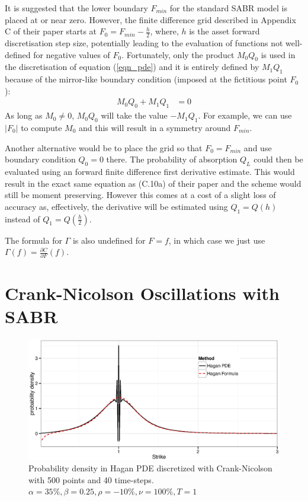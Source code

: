 \documentclass[]{rAMF2e}
\begin{document}
It is suggested that the lower boundary $F_{min}$ for the standard SABR model is placed at or near zero. However, the finite difference grid described in Appendix C of their paper starts at  $F_0 = F_{min} - \frac{h}{2}$, where, $h$ is the asset forward discretisation step size, potentially leading to the evaluation of functions not well-defined for negative values of $F_0$. Fortunately, only the product $M_0 Q_0$ is used in the discretisation of equation (\ref{eqn_pde}) and it is entirely defined by $M_1 Q_1$  because of the mirror-like boundary condition (imposed at the fictitious point $F_0$): 
\begin{align}\label{boundary_condition}
M_0 Q_0 + M_1 Q_1 &= 0
\end{align}
As long as $M_0 \neq 0$, $M_0 Q_0$ will take the value $-M_1 Q_1$. For example, we can use $|F_0|$ to compute $M_0$ and this will result in a symmetry around $F_{min}$.


Another alternative would be to place the grid so that $F_0 = F_{min}$ and use boundary condition $Q_0 = 0$ there. The probability of absorption $Q_L$ could then be evaluated using an forward finite difference first derivative estimate. This would result in the exact same equation as (C.10a) of their paper and the scheme would still be moment preserving. However this comes at a cost of a slight loss of accuracy as, effectively, the derivative will be estimated using $Q_1 = Q(h)$ instead of $Q_1 = Q(\frac{h}{2})$.

The formula for $\Gamma$ is also undefined for $F=f$, in which case we just use $\Gamma(f) = \frac{\partial C}{\partial F}(f)$.

\section{Crank-Nicolson Oscillations with SABR}\label{section_cn}
\begin{figure}[htb]
  \begin{center}  
    \includegraphics[width=12cm]{density_hagan_cn_500_40.eps}
  \end{center}
     \caption{\label{fig:density_hagan_cn_500_40} Probability density in Hagan PDE discretized with Crank-Nicolson with 500 points and 40 time-steps. $\alpha=35\%, \beta=0.25, \rho=-10\%, \nu=100\%, T=1$}
\end{figure}
\end{document}
